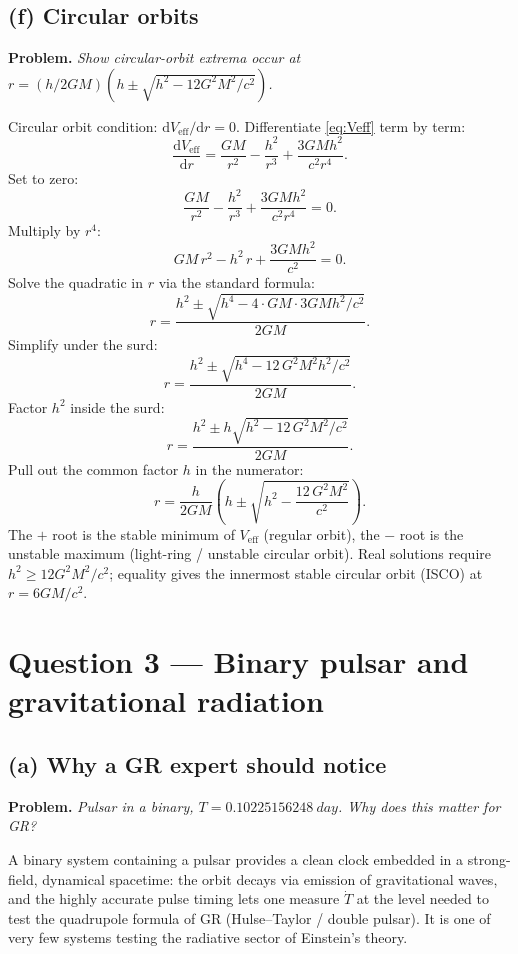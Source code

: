 \documentclass[11pt]{article}
\newcommand{\de}{\mathrm{d}}
\begin{document}
\subsection*{(f) Circular orbits}

\textbf{Problem.} \emph{Show circular-orbit extrema occur at $r = (h/2GM)\!\left(h\pm\sqrt{h^2 - 12 G^2M^2/c^2}\right)$.}

Circular orbit condition: $\de V_{\mathrm{eff}}/\de r = 0$. Differentiate \eqref{eq:Veff} term by term:
\[
\frac{\de V_{\mathrm{eff}}}{\de r} = \frac{GM}{r^2} - \frac{h^2}{r^3} + \frac{3GM h^2}{c^2 r^4}.
\]
Set to zero:
\[
\frac{GM}{r^2} - \frac{h^2}{r^3} + \frac{3GM h^2}{c^2 r^4} = 0.
\]
Multiply by $r^4$:
\[
GM\,r^2 - h^2\,r + \frac{3GM h^2}{c^2} = 0.
\]
Solve the quadratic in $r$ via the standard formula:
\[
r = \frac{h^2 \pm \sqrt{h^4 - 4\cdot GM\cdot 3GM h^2/c^2}}{2GM}.
\]
Simplify under the surd:
\[
r = \frac{h^2 \pm \sqrt{h^4 - 12\,G^2 M^2 h^2/c^2}}{2GM}.
\]
Factor $h^2$ inside the surd:
\[
r = \frac{h^2 \pm h\sqrt{h^2 - 12\,G^2 M^2/c^2}}{2GM}.
\]
Pull out the common factor $h$ in the numerator:
\[
\boxed{\;r = \frac{h}{2GM}\!\left(h \pm \sqrt{h^2 - \frac{12\,G^2M^2}{c^2}}\right).\;}
\]
The $+$ root is the stable minimum of $V_{\mathrm{eff}}$ (regular orbit), the $-$ root is the unstable maximum (light-ring / unstable circular orbit). Real solutions require $h^2 \geq 12 G^2 M^2/c^2$; equality gives the innermost stable circular orbit (ISCO) at $r = 6GM/c^2$.

\section*{Question 3 --- Binary pulsar and gravitational radiation}

\subsection*{(a) Why a GR expert should notice}

\textbf{Problem.} \emph{Pulsar in a binary, $T = \SI{0.10225156248}{day}$. Why does this matter for GR?}

A binary system containing a pulsar provides a clean clock embedded in a strong-field, dynamical spacetime: the orbit decays via emission of gravitational waves, and the highly accurate pulse timing lets one measure $\dot T$ at the level needed to test the quadrupole formula of GR (Hulse--Taylor / double pulsar). It is one of very few systems testing the radiative sector of Einstein's theory.
\end{document}
